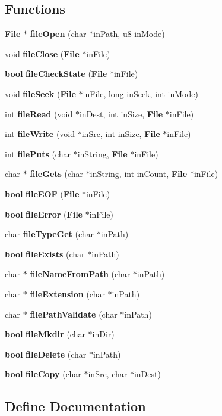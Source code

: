 \subsection*{Functions}
\begin{CompactItemize}
\item 
{\bf File} $\ast$ {\bf file\-Open} (char $\ast$in\-Path, u8 in\-Mode)
\item 
void {\bf file\-Close} ({\bf File} $\ast$in\-File)
\item 
{\bf bool} {\bf file\-Check\-State} ({\bf File} $\ast$in\-File)
\item 
void {\bf file\-Seek} ({\bf File} $\ast$in\-File, long in\-Seek, int in\-Mode)
\item 
int {\bf file\-Read} (void $\ast$in\-Dest, int in\-Size, {\bf File} $\ast$in\-File)
\item 
int {\bf file\-Write} (void $\ast$in\-Src, int in\-Size, {\bf File} $\ast$in\-File)
\item 
int {\bf file\-Puts} (char $\ast$in\-String, {\bf File} $\ast$in\-File)
\item 
char $\ast$ {\bf file\-Gets} (char $\ast$in\-String, int in\-Count, {\bf File} $\ast$in\-File)
\item 
{\bf bool} {\bf file\-EOF} ({\bf File} $\ast$in\-File)
\item 
{\bf bool} {\bf file\-Error} ({\bf File} $\ast$in\-File)
\item 
char {\bf file\-Type\-Get} (char $\ast$in\-Path)
\item 
{\bf bool} {\bf file\-Exists} (char $\ast$in\-Path)
\item 
char $\ast$ {\bf file\-Name\-From\-Path} (char $\ast$in\-Path)
\item 
char $\ast$ {\bf file\-Extension} (char $\ast$in\-Path)
\item 
char $\ast$ {\bf file\-Path\-Validate} (char $\ast$in\-Path)
\item 
{\bf bool} {\bf file\-Mkdir} (char $\ast$in\-Dir)
\item 
{\bf bool} {\bf file\-Delete} (char $\ast$in\-Path)
\item 
{\bf bool} {\bf file\-Copy} (char $\ast$in\-Src, char $\ast$in\-Dest)
\end{CompactItemize}


\subsection{Define Documentation}
